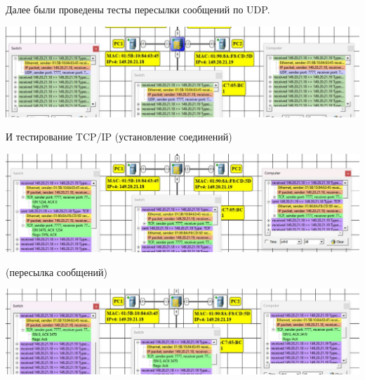 \documentclass{article}
\begin{document}
Далее были проведены тесты пересылки сообщений по UDP.
\begin{center}
    \includegraphics[width=.9\textwidth]{com3.jpg}
\end{center}
И тестирование TCP/IP
(установление соединений)
\begin{center}
    \includegraphics[width=.9\textwidth]{com4.jpg}
\end{center}

(пересылка сообщений)
\begin{center}
    \includegraphics[width=.9\textwidth]{com5.jpg}
\end{center}
\end{document}
